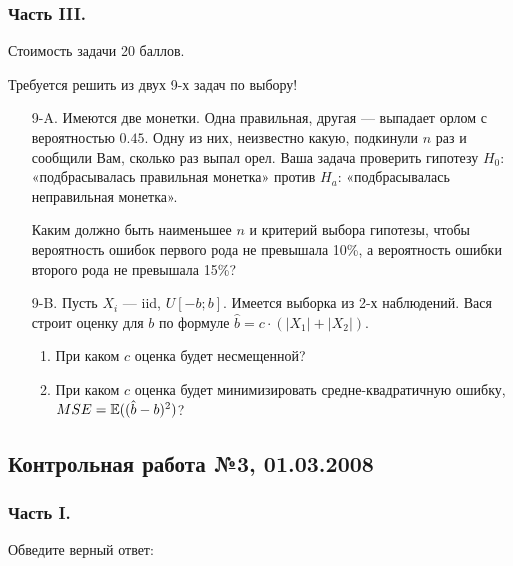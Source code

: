 \subsubsection*{Часть III.}

Стоимость задачи 20 баллов.

Требуется решить \textbf{} из двух 9-х задач по
выбору!

\begin{enumerate}
\item[9-A.] Имеются две монетки. Одна правильная, другая — выпадает орлом с
вероятностью $0.45$. Одну из них, неизвестно какую, подкинули $n$
раз и сообщили Вам, сколько раз выпал орел. Ваша задача проверить
гипотезу $H_{0}$: «подбрасывалась правильная монетка» против
$H_{a}$:
«подбрасывалась неправильная монетка».

Каким должно быть наименьшее $n$ и критерий выбора гипотезы, чтобы
вероятность ошибок первого рода не превышала 10\%, а вероятность
ошибки второго рода не превышала 15\%?

\item[9-B.] Пусть $X_{i}$ — iid, $U[-b;b]$. Имеется выборка из 2-х наблюдений. Вася строит оценку для $b$ по формуле $\hat{b}=c\cdot (|X_{1}|+|X_{2}|)$.
\begin{enumerate}
\item При каком $c$ оценка будет несмещенной?
\item При каком $c$ оценка будет минимизировать средне-квадратичную ошибку, $MSE=\mathbb{E}((\hat{b}-b)^{2})$?
\end{enumerate}
\end{enumerate}

\subsection{Контрольная работа №3, 01.03.2008}

\subsubsection*{Часть I.}

Обведите верный ответ:

